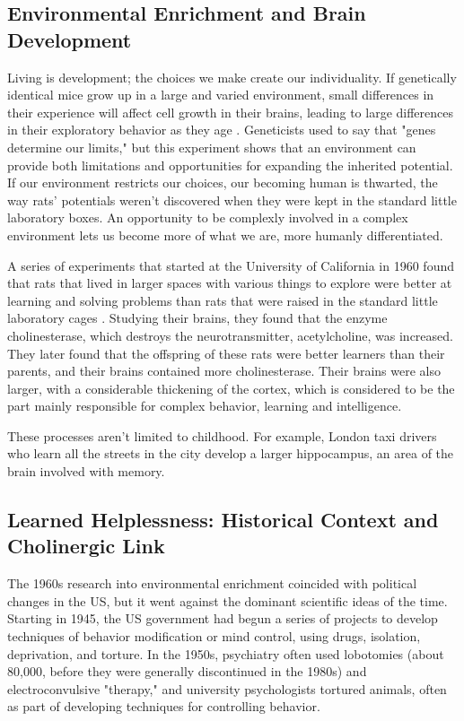 \documentclass{article}
\begin{document}
\subsection{Environmental Enrichment and Brain Development}
Living is development; the choices we make create our individuality. If genetically identical mice grow up in a large and varied environment, small differences in their experience will affect cell growth in their brains, leading to large differences in their exploratory behavior as they age \cite{Freund2013}. Geneticists used to say that "genes determine our limits," but this experiment shows that an environment can provide both limitations and opportunities for expanding the inherited potential. If our environment restricts our choices, our becoming human is thwarted, the way rats' potentials weren't discovered when they were kept in the standard little laboratory boxes. An opportunity to be complexly involved in a complex environment lets us become more of what we are, more humanly differentiated.

A series of experiments that started at the University of California in 1960 found that rats that lived in larger spaces with various things to explore were better at learning and solving problems than rats that were raised in the standard little laboratory cages \cite{Krech1960}. Studying their brains, they found that the enzyme cholinesterase, which destroys the neurotransmitter, acetylcholine, was increased. They later found that the offspring of these rats were better learners than their parents, and their brains contained more cholinesterase. Their brains were also larger, with a considerable thickening of the cortex, which is considered to be the part mainly responsible for complex behavior, learning and intelligence.

These processes aren't limited to childhood. For example, London taxi drivers who learn all the streets in the city develop a larger hippocampus, an area of the brain involved with memory.

\subsection{Learned Helplessness: Historical Context and Cholinergic Link}
The 1960s research into environmental enrichment coincided with political changes in the US, but it went against the dominant scientific ideas of the time. Starting in 1945, the US government had begun a series of projects to develop techniques of behavior modification or mind control, using drugs, isolation, deprivation, and torture. In the 1950s, psychiatry often used lobotomies (about 80,000, before they were generally discontinued in the 1980s) and electroconvulsive "therapy," and university psychologists tortured animals, often as part of developing techniques for controlling behavior.
\end{document}
